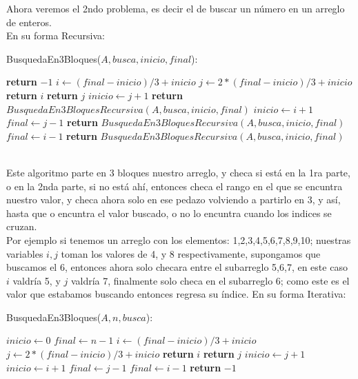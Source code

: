 \documentclass[12pt,twoside]{article}
\begin{document}
\newpage
Ahora veremos el 2ndo problema, es decir el de buscar un número en un arreglo de enteros.
\\ En su forma Recursiva:
\begin{algorithm}
    \caption{BusquedaEn3Bloques($A,busca,inicio,final$):}
    \begin{algorithmic}
            \State \textbf{return} $-1$
        \Else
            \State $i \gets (final-inicio)/3+inicio$
            \State $j \gets 2*(final-inicio)/3+inicio$
                \State \textbf{return} $i$
                \State \textbf{return} $j$
                \State $inicio \gets j + 1$
                \State \textbf{return} $BusquedaEn3BloquesRecursiva(A, busca, inicio, final)$
                \State $inicio \gets i + 1$
                \State $final \gets j - 1$
                \State \textbf{return} $BusquedaEn3BloquesRecursiva(A, busca, inicio, final)$
            \Else
                \State $final \gets i - 1$
                \State \textbf{return} $BusquedaEn3BloquesRecursiva(A, busca, inicio, final)$
            \EndIf
        \EndIf 
    \end{algorithmic}
\end{algorithm}
\\ Este algoritmo parte en 3 bloques nuestro arreglo, y checa si está en la 1ra parte, o en la 2nda parte, si no está ahí, entonces checa el rango en el que se encuntra nuestro valor, y checa ahora solo en ese pedazo volviendo a partirlo en 3, y así, hasta que o encuntra el valor buscado, o no lo encuntra cuando los indices se cruzan.
\\ Por ejemplo si tenemos un arreglo con los elementos: 1,2,3,4,5,6,7,8,9,10; nuestras variables $i,j$ toman los valores de 4, y 8 respectivamente, supongamos que buscamos el 6, entonces ahora solo checara entre el subarreglo 5,6,7, en este caso $i$ valdría 5, y $j$ valdría 7, finalmente solo checa en el subarreglo 6; como este es el valor que estabamos buscando entonces regresa su índice.
\newpage
En su forma Iterativa:
\begin{algorithm}
    \caption{BusquedaEn3Bloques($A,n,busca$):}
    \begin{algorithmic}
        \State $inicio \gets 0$
        \State $final \gets n-1$
            \State $i \gets (final-inicio)/3+inicio$
            \State $j \gets 2*(final-inicio)/3+inicio$
                \State \textbf{return} $i$
                \State \textbf{return} $j$
                \State $inicio \gets j + 1$
                \State $inicio \gets i + 1$
                \State $final \gets j - 1$
            \Else
                \State $final \gets i - 1$
            \EndIf
        \EndWhile
        \State \textbf{return} $-1$
    \end{algorithmic}
\end{algorithm}
\end{document}
